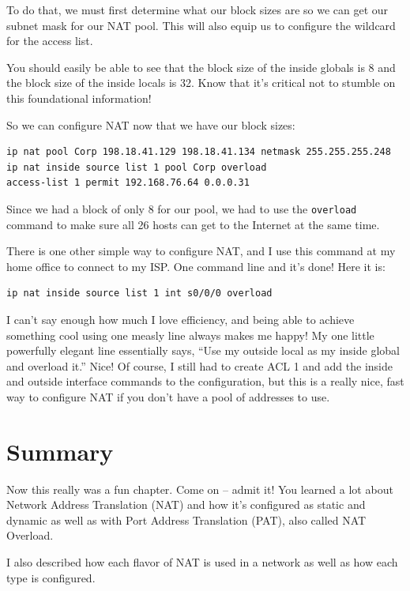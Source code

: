 \documentclass[b5paper,11pt]{memoir}
\begin{document}
To do that, we must first determine what our block sizes are so we can
get our subnet mask for our NAT pool. This will also equip us to
configure the wildcard for the access list.

You should easily be able to see that the block size of the inside
globals is 8 and the block size of the inside locals is 32. Know that
it's critical not to stumble on this foundational information!

So we can configure NAT now that we have our block sizes:

\begin{verbatim}
ip nat pool Corp 198.18.41.129 198.18.41.134 netmask 255.255.255.248
ip nat inside source list 1 pool Corp overload
access-list 1 permit 192.168.76.64 0.0.0.31
\end{verbatim}

Since we had a block of only 8 for our pool, we had to use the
\texttt{overload} command to make sure all 26 hosts can get to the
Internet at the same time.

There is one other simple way to configure NAT, and I use this command
at my home office to connect to my ISP. One command line and it's done!
Here it is:

\begin{verbatim}
ip nat inside source list 1 int s0/0/0 overload
\end{verbatim}

I can't say enough how much I love efficiency, and being able to achieve
something cool using one measly line always makes me happy! My one
little powerfully elegant line essentially says, ``Use my outside local
as my inside global and overload it.'' Nice! Of course, I still had to
create ACL 1 and add the inside and outside interface commands to the
configuration, but this is a really nice, fast way to configure NAT if
you don't have a pool of addresses to use.



\section{Summary}

Now this really was a fun chapter. Come on -- admit it! You learned a lot
about Network Address Translation (NAT) and how it's configured as
static and dynamic as well as with Port Address Translation (PAT), also
called NAT Overload.

I also described how each flavor of NAT is used in a network as well as
how each type is configured.
\end{document}
